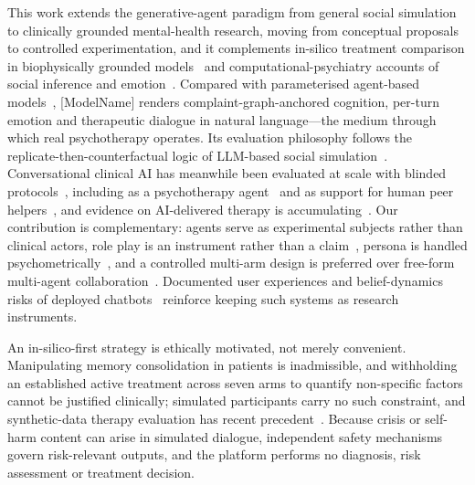 \documentclass[sn-nature,pdflatex]{sn-jnl}
\begin{document}
This work extends the generative-agent paradigm from general social simulation~\cite{park2023,gao2024} to clinically grounded mental-health research, moving from conceptual proposals~\cite{kambeitz2025npj,doraiswamy2025,rhoads2024} to controlled experimentation, and it complements in-silico treatment comparison in biophysically grounded models~\cite{deco2024} and computational-psychiatry accounts of social inference and emotion~\cite{barnby2024,trier2025,zavlis2025}. Compared with parameterised agent-based models~\cite{bonabeau2002}, [ModelName] renders complaint-graph-anchored cognition, per-turn emotion and therapeutic dialogue in natural language---the medium through which real psychotherapy operates. Its evaluation philosophy follows the replicate-then-counterfactual logic of LLM-based social simulation~\cite{qu2024,ji2026}. Conversational clinical AI has meanwhile been evaluated at scale with blinded protocols~\cite{tu2025,saab2026,johri2025}, including as a psychotherapy agent~\cite{rollwage2026} and as support for human peer helpers~\cite{sharma2023}, and evidence on AI-delivered therapy is accumulating~\cite{heinz2025,hang2026,hua2025,stade2024}. Our contribution is complementary: agents serve as experimental subjects rather than clinical actors, role play is an instrument rather than a claim~\cite{shanahan2023}, persona is handled psychometrically~\cite{serapio2025,wright2026}, and a controlled multi-arm design is preferred over free-form multi-agent collaboration~\cite{kim2026}. Documented user experiences and belief-dynamics risks of deployed chatbots~\cite{maples2024,siddals2024,dohany2026} reinforce keeping such systems as research instruments.

An in-silico-first strategy is ethically motivated, not merely convenient. Manipulating memory consolidation in patients is inadmissible, and withholding an established active treatment across seven arms to quantify non-specific factors cannot be justified clinically; simulated participants carry no such constraint, and synthetic-data therapy evaluation has recent precedent~\cite{yosef2025}. Because crisis or self-harm content can arise in simulated dialogue, independent safety mechanisms govern risk-relevant outputs, and the platform performs no diagnosis, risk assessment or treatment decision.
\end{document}

